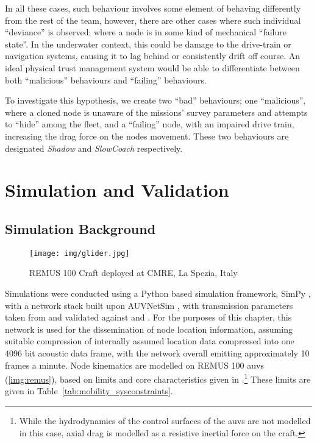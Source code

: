 In all these cases, such behaviour involves some element of behaving differently from the rest of the team, however, there are other cases where such individual ``deviance'' is observed; where a node is in some kind of mechanical ``failure state''.
In the underwater context, this could be damage to the drive-train or navigation systems, causing it to lag behind or consistently drift off course. 
An ideal physical trust management system would be able to differentiate between both ``malicious'' behaviours and ``failing'' behaviours.

To investigate this hypothesis, we create two ``bad'' behaviours; one ``malicious'', where a cloned node is unaware of the missions' survey parameters and attempts to ``hide'' among the fleet, and a ``failing'' node, with an impaired drive train, increasing the drag force on the nodes movement.
These two behaviours are designated \emph{Shadow} and \emph{SlowCoach} respectively.

\section{Simulation and Validation}\label{sec:sim_and_valid}

\subsection{Simulation Background}

\begin{figure}
	\centering
	\texttt{[image: img/glider.jpg]}
	\caption{REMUS 100 Craft deployed at CMRE, La Spezia, Italy}
	\label{img:remus}
\end{figure}

Simulations were conducted using a Python based simulation framework, SimPy \cite{Mueller2003SimPy}, with a network stack built upon AUVNetSim \cite{Miquel2008}, with transmission parameters taken from and validated against \cite{Stojanovic2007} and \cite{Stefanov2011}.
For the purposes of this chapter, this network is used for the dissemination of node location information, assuming suitable compression of internally assumed location data compressed into one 4096 bit acoustic data frame, with the network overall emitting approximately 10 frames a minute.
Node kinematics are modelled on REMUS 100 \glspl{auv} (\autoref{img:remus}), based on limits and core characteristics given in \cite{Mcewen2001,Milgram2001,Samad2011}.\footnote{While the hydrodynamics of the control surfaces of the \glspl{auv} are not modelled in this case, axial drag is modelled as a resistive inertial force on the craft.}
These limits are given in Table~\ref{tab:mobility_sysconstraints}.


